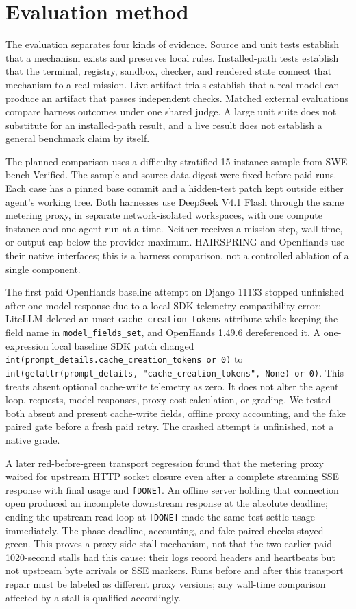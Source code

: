 \documentclass[10pt,letterpaper]{article}
\newcommand{\code}[1]{\texttt{\small #1}}
\begin{document}
\section{Evaluation method}
The evaluation separates four kinds of evidence. Source and unit tests establish that a mechanism exists and preserves local rules. Installed-path tests establish that the terminal, registry, sandbox, checker, and rendered state connect that mechanism to a real mission. Live artifact trials establish that a real model can produce an artifact that passes independent checks. Matched external evaluations compare harness outcomes under one shared judge. A large unit suite does not substitute for an installed-path result, and a live result does not establish a general benchmark claim by itself.

The planned comparison uses a difficulty-stratified 15-instance sample from SWE-bench Verified. The sample and source-data digest were fixed before paid runs. Each case has a pinned base commit and a hidden-test patch kept outside either agent's working tree. Both harnesses use DeepSeek V4.1 Flash through the same metering proxy, in separate network-isolated workspaces, with one compute instance and one agent run at a time. Neither receives a mission step, wall-time, or output cap below the provider maximum. HAIRSPRING and OpenHands use their native interfaces; this is a harness comparison, not a controlled ablation of a single component.

The first paid OpenHands baseline attempt on Django 11133 stopped unfinished after one model response due to a local SDK telemetry compatibility error: LiteLLM deleted an unset \code{cache\_creation\_tokens} attribute while keeping the field name in \code{model\_fields\_set}, and OpenHands 1.49.6 dereferenced it. A one-expression local baseline SDK patch changed \code{int(prompt\_details.cache\_creation\_tokens or 0)} to \code{int(getattr(prompt\_details, "cache\_creation\_tokens", None) or 0)}. This treats absent optional cache-write telemetry as zero. It does not alter the agent loop, requests, model responses, proxy cost calculation, or grading. We tested both absent and present cache-write fields, offline proxy accounting, and the fake paired gate before a fresh paid retry. The crashed attempt is unfinished, not a native grade.

A later red-before-green transport regression found that the metering proxy waited for upstream HTTP socket closure even after a complete streaming SSE response with final usage and \code{[DONE]}. An offline server holding that connection open produced an incomplete downstream response at the absolute deadline; ending the upstream read loop at \code{[DONE]} made the same test settle usage immediately. The phase-deadline, accounting, and fake paired checks stayed green. This proves a proxy-side stall mechanism, not that the two earlier paid 1020-second stalls had this cause: their logs record headers and heartbeats but not upstream byte arrivals or SSE markers. Runs before and after this transport repair must be labeled as different proxy versions; any wall-time comparison affected by a stall is qualified accordingly.
\end{document}
